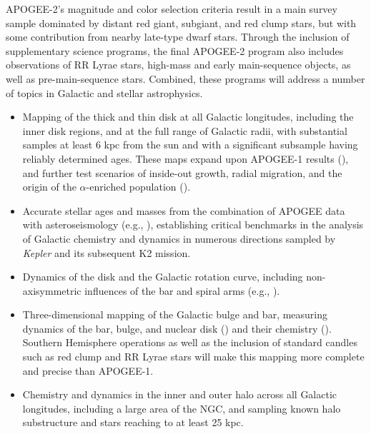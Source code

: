 APOGEE-2's magnitude and color selection criteria result in a main
survey sample dominated by distant red giant, subgiant, and red clump
stars, but with some contribution from nearby late-type dwarf stars.
Through the inclusion of supplementary science programs, the final
APOGEE-2 program also includes observations of RR Lyrae stars,
high-mass and early main-sequence objects, as well as
pre-main-sequence stars. Combined, these programs will address a
number of topics in Galactic and stellar astrophysics.

\begin{itemize}
\item Mapping of the thick and thin disk at all Galactic
  longitudes, including the inner disk regions, and at the full range
  of Galactic radii, with substantial samples at least 6 kpc from the
  sun and with a significant subsample having reliably determined
  ages. These maps expand upon APOGEE-1 results
  (\citealt{anders14a, nidever14a, hayden15a}), and further test
  scenarios of inside-out growth, radial migration, and the origin of
  the $\alpha$-enriched population (\citealt{chiappini15a, martig15a,
    bovy16c}).

\item 
  Accurate stellar ages and masses from the combination of APOGEE data
  with asteroseismology (e.g., \citealt{epstein14a, chiappini15a,
    martig15a}), establishing critical benchmarks in the analysis of
  Galactic chemistry and dynamics in numerous directions sampled by
  {\it Kepler} and its subsequent K2 mission.

\item Dynamics of the disk and the Galactic rotation curve, including
  non-axisymmetric influences of the bar and spiral arms (e.g.,
  \citealt{bovy12a, bovy15a}).

\item Three-dimensional mapping of the Galactic bulge and bar, measuring
  dynamics of the bar, bulge, and nuclear disk (\citealt{nidever12a,
    schonrich15a, ness16a}) and their chemistry
  (\citealt{garciaperez13a, ness15a}).  Southern Hemisphere operations
  as well as the inclusion of standard candles such as red clump and
  RR Lyrae stars will make this mapping more complete and precise than
  APOGEE-1.

\item Chemistry and dynamics in the inner and outer halo across all
  Galactic longitudes, including a large area of the NGC, and sampling
  known halo substructure and stars reaching to at least 25 kpc.


\end{itemize}
